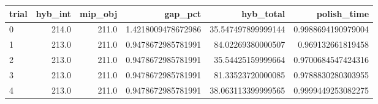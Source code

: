 \begin{tabular}{lrrrrr}
\hline
trial & hyb_int & mip_obj & gap_pct & hyb_total & polish_time \\ \hline
0 & 214.0 & 211.0 & 1.4218009478672986 & 35.547497899999144 & 0.9988694190979004 \\
1 & 213.0 & 211.0 & 0.9478672985781991 & 84.02269380000507 & 0.969132661819458 \\
2 & 213.0 & 211.0 & 0.9478672985781991 & 35.54425159999664 & 0.9700684547424316 \\
3 & 213.0 & 211.0 & 0.9478672985781991 & 81.33523720000085 & 0.9788830280303955 \\
4 & 213.0 & 211.0 & 0.9478672985781991 & 38.063113399999565 & 0.9999449253082275 \\
\hline
\end{tabular}
